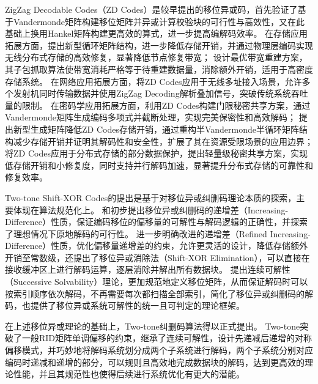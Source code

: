ZigZag Decodable Codes（ZD Codes）是较早提出的移位异或码，首先验证了基于Vandermonde矩阵构建移位矩阵并异或计算校验块的可行性与高效性\cite{sungZigZagDecodableCodeMDS2013}，又在此基础上换用Hankel矩阵构建更高效的算式，进一步提高编解码效率\cite{gongZigzagDecodableCodes2017}。
在存储应用拓展方面，提出新型循环矩阵结构，进一步降低存储开销，并通过物理层编码实现无线分布式存储的高效修复，显著降低节点修复带宽；
设计最优带宽重建方案，其子包抓取算法使带宽消耗严格等于待重建数据量，消除额外开销，适用于高密度存储系统。
在网络应用拓展方面，将ZD Codes应用于无线多址接入场景，允许多个发射机同时传输数据并使用ZigZag Decoding解析叠加信号，突破传统系统吞吐量的限制。
在密码学应用拓展方面，利用ZD Codes构建门限秘密共享方案，通过Vandermonde矩阵生成编码多项式并截断处理，实现完美保密性和高效解码；
提出新型生成矩阵降低ZD Codes存储开销，通过重构半Vandermonde半循环矩阵结构减少存储开销并证明其解码性和安全性，扩展了其在资源受限场景的应用边界；将ZD Codes应用于分布式存储的部分数据保护，提出轻量级秘密共享方案，实现低存储开销和小修复度，同时支持并行解码加速，显著提升分布式存储的可靠性和修复效率。

Two-tone Shift-XOR Codes的提出是基于对移位异或纠删码理论本质的探索，主要体现在算法规范化上。
和初步提出移位异或纠删码的递增差（Increasing-Difference）性质，保证编码移位的偏移量的可解性与解码逻辑的正确性，并探索了理想情况下原地解码的可行性。
进一步明确改进的递增差（Refined Increasing-Difference）性质，优化偏移量递增差的约束，允许更灵活的设计，降低存储额外开销至常数级，还提出了移位异或消除法（Shift-XOR Elimination），可以直接在接收缓冲区上进行解码运算，逐层消除并解出所有数据块。
提出连续可解性（Successive Solvability）理论，更加规范地定义移位矩阵，从而保证解码时可以按索引顺序依次解码，不再需要每次都扫描全部索引，简化了移位异或纠删码的解码，也提供了移位异或系统可解性的统一且可判定的理论框架。

在上述移位异或理论的基础上，Two-tone纠删码算法\cite{fuTwotoneShiftXORStorage2021}得以正式提出。
Two-tone突破了一般RID矩阵单调偏移的约束，继承了连续可解性，设计先递减后递增的对称偏移模式，并巧妙地将解码系统划分成两个子系统进行解码，两个子系统分别对应编码时递减和递增的部分，可以规则且高效地完成数据块的解码，达到更高效的理论性能，并且其规范性也使得后续进行系统优化有更大的潜能。

